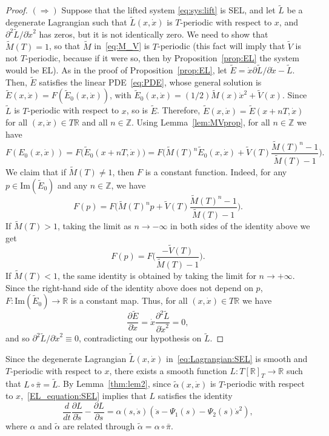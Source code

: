 \begin{proof}
	
	$(\Rightarrow)$ Suppose that the lifted system \eqref{eq:sys:lift} is
	SEL, and let $\tilde L$ be a degenerate Lagrangian such that $\tilde
	L(x,\dot x)$ is $T$-periodic with respect to $x$, and $\partial^2
	\tilde L / \partial \dot x^2$ has zeros, but it is not identically
	zero. We need to show that $\tilde M(T)=1$, so that $\tilde M$
	in~\eqref{eq:M_V} is $T$-periodic (this fact will imply that $\tilde
	V$ is not $T$-periodic, because if it were so, then by
	Proposition~\ref{prop:EL} the system would be EL). As in the proof of
	Proposition~\ref{prop:EL}, let $\tilde E = \dot x \partial \tilde L /
	\partial \dot x - \tilde L$. Then, $\tilde E$ satisfies the linear
	PDE~\eqref{eq:PDE}, whose general solution is
	$\tilde{E}(x,\dot{x})=F(\tilde{E}_0(x,\dot{x}))$, with
	$\tilde{E}_0(x,\dot{x})=(1/2)\tilde{M}(x)\dot{x}^2+\tilde{V}(x)$. Since
	$\tilde L$ is $T$-periodic with respect to $x$, so is $\tilde
	E$. Therefore, $\tilde{E}(x,\dot{x})=\tilde{E}(x+ nT,\dot{x})$ for all
	$(x,\dot{x})\in T\mathbb{R}$ and all $n \in \mathbb{Z}$. Using
	Lemma~\ref{lem:MVprop}, for all $n \in\mathbb{Z}$ we have
				\[
	F(E_0(x,\dot x)) = F \big( \tilde{E}_0(x
	+nT,\dot{x}) \big)= F \Bigg( \tilde{M}(T)^n\tilde{E}_0(x,\dot{x})+\tilde{V}(T)
	\frac{\tilde{M}(T)^n-1}{\tilde{M}(T)-1} \Bigg).
	\]
				We claim that if $\tilde{M}(T)\neq 1$, then $F$ is a constant
	function. Indeed, for any $p \in \mathrm{Im}(\tilde E_0)$ and any $n
	\in \mathbb{Z}$, we have
				\[
	F(p) = F\Bigg( \tilde{M}(T)^n
	p+\tilde{V}(T)\frac{\tilde{M}(T)^n-1}{\tilde{M}(T)-1} \Bigg).
	\]
				If $\tilde M(T) >1$, taking the limit as $n \to - \infty$ in both
	sides of the identity above we get
				\[
	F(p) = F\Bigg(\frac{-\tilde{V}(T)}{\tilde{M}(T)-1}\Bigg).
	\]
				If $\tilde M(T) <1$, the same identity is obtained by taking the limit
	for $n \to +\infty$. Since the right-hand side of the identity above
	does not depend on $p$, $F: \mathrm{Im}(\tilde E_0) \to \mathbb{R}$ is a
	constant map. Thus, for all $(x,\dot x) \in T\mathbb{R}$ we have 
				\[
	\frac{\partial \tilde E}{\partial \dot x} = \dot x \frac{\partial^2
		\tilde L}{\partial \dot x^2} =0,
	\]
				and so $\partial^2 \tilde L / \partial \dot{x}^2 \equiv 0$,
	contradicting our hypothesis on $\tilde L$.  \qquad\end{proof}
\begin{remark}\label{rem:SEL}
	Since the degenerate Lagrangian $\tilde L(x,\dot x)$
	in~\eqref{eq:Lagrangian:SEL} is smooth and $T$-periodic with respect
	to $x$, there exists a smooth function $L : T [\mathbb{R}]_T \to \mathbb{R}$ such
	that $L\circ \bar{\pi} = \tilde L$. By Lemma~\ref{thm:lem2}, since $\tilde
	\alpha(x,\dot x)$ is $T$-periodic with respect to
	$x$,~\eqref{EL_equation:SEL} implies that $L$ satisfies the identity
				\[
	\frac{d}{dt} \frac{\partial L}{\partial \dot s} - \frac{\partial
		L}{\partial s} = \alpha(s,\dot s) \left( \ddot s - \Psi_1(s) -
	\Psi_2(s) \dot s^2 \right),
	\]
				where $\alpha$ and $\tilde \alpha$ are related through $\tilde \alpha =
	\alpha \circ \bar{\pi}$.
\end{remark}


